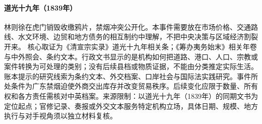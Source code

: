 \hypertarget{civic:EQ-1839-HUMEN-OPIUM-DESTRUCTION}{}\paragraph{道光十九年（1839年）}林则徐在虎门销毁收缴鸦片，禁烟冲突公开化。本事件需要放在市场价格、交通路线、水文环境、边贸和地方债务的相互制约中理解，不把中央决策与区域经济割裂开来。 核心取证为《清宣宗实录》道光十九年相关条；《筹办夷务始末》相关年卷与中外照会、条约文本。行政文书显示的是机构如何把道路、港口、人口、宗教或案件转换为可处理的类别；没有后续县档或物质证据，不能由分类推定实际生活。账本提示的研究线索为条约文本、外交档案、口岸社会与国际法实践研究。事件所处条件为广东禁烟迫使外商交出库存并改变贸易秩序。后续变化应限于数量、所有权和各方责任需核对中英档案。来源限制：以道光十九年（1839年）的同期文书为定位起点；官修记录、奏报或外交文本服务特定机构立场，具体日期、规模、地方执行与对手视角须以独立材料复核。
